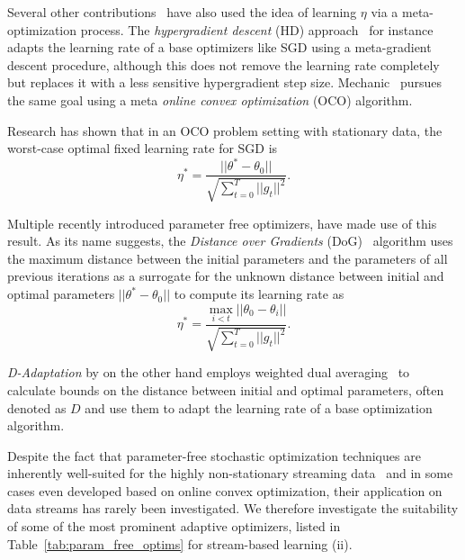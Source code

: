 \documentclass[letterpaper]{article} %
\begin{document}
Several other contributions~\cite{vanervenMetaGradMultipleLearning2016a,baydinOnlineLearningRate2018,cutkoskyMechanicLearningRate2023} have also used the idea of learning $\eta$ via a meta-optimization process.
The \textit{hypergradient descent} (HD) approach~\cite{baydinOnlineLearningRate2018} for instance adapts the learning rate of a base optimizers like SGD using a meta-gradient descent procedure, although this does not remove the learning rate completely but replaces it with a less sensitive hypergradient step size.
Mechanic~\cite{cutkoskyMechanicLearningRate2023} pursues the same goal using a meta \textit{online convex optimization} (OCO) algorithm.

Research has shown that in an OCO problem setting with stationary data, the worst-case optimal fixed learning rate for SGD is
\begin{equation}\label{eq:oco_optimal_lr}
	\eta^* = \frac{||\theta^* - \theta_0||}{\sqrt{\sum_{t=0}^{T} ||g_t||^2}}.
\end{equation}

Multiple recently introduced parameter free optimizers, have made use of this result.
As its name suggests, the \textit{Distance over Gradients} (DoG)~\cite{ivgiDoGSGDBest2023} algorithm uses the maximum distance between the initial parameters and the parameters of all previous iterations as a surrogate for the unknown distance between initial and optimal parameters $||\theta^* - \theta_0||$ to compute its learning rate as
\begin{equation}
	\eta^* = \frac{\max_{i<t}||\theta_0 - \theta_i||}{\sqrt{\sum_{t=0}^{T} ||g_t||^2}}.
\end{equation}

\textit{D-Adaptation} by \citet{defazioLearningRateFreeLearningDAdaptation2023a} on the other hand employs weighted dual averaging~\cite{duchiDualAveragingDistributed2012} to calculate bounds on the distance between initial and optimal parameters, often denoted as $D$ and use them to adapt the learning rate of a base optimization algorithm.

Despite the fact that parameter-free stochastic optimization techniques are inherently well-suited for the highly non-stationary streaming data~\cite{schaulNoMorePesky2013} and in some cases even developed based on online convex optimization, their application on data streams has rarely been investigated.
We therefore investigate the suitability of some of the most prominent adaptive optimizers, listed in Table~\ref{tab:param_free_optims} for stream-based learning (ii).
\end{document}
